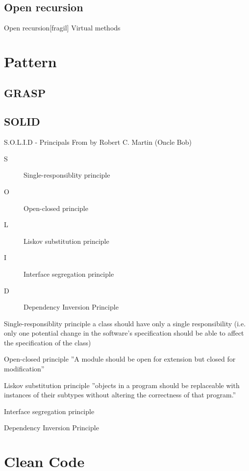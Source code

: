 \subsection{Open recursion}
\begin{frame}{Open recursion}[fragil]
Virtual methods




\end{frame}


\section{Pattern}


\subsection{GRASP}

\subsection{SOLID}

\begin{frame}{S.O.L.I.D - Principals}
From by Robert C. Martin (Oncle Bob)


\begin{description}
\item [S] Single-responsiblity principle
\item [O] Open-closed principle
\item [L] Liskov substitution principle
\item [I] Interface segregation principle
\item [D] Dependency Inversion Principle
\end{description}
\end{frame}

\begin{frame}{Single-responsiblity principle}
a class should have only a single responsibility (i.e. only one potential change
in the software's specification should be able to affect the specification of the class)
\end{frame}

\begin{frame}{Open-closed principle}
''A module should be open for extension but closed for modification''
\end{frame}

\begin{frame}{Liskov substitution principle}
''objects in a program should be replaceable with instances of their subtypes
without altering the correctness of that program.''
\end{frame}

\begin{frame}{Interface segregation principle}
\end{frame}

\begin{frame}{Dependency Inversion Principle}
\end{frame}

\section{Clean Code}




